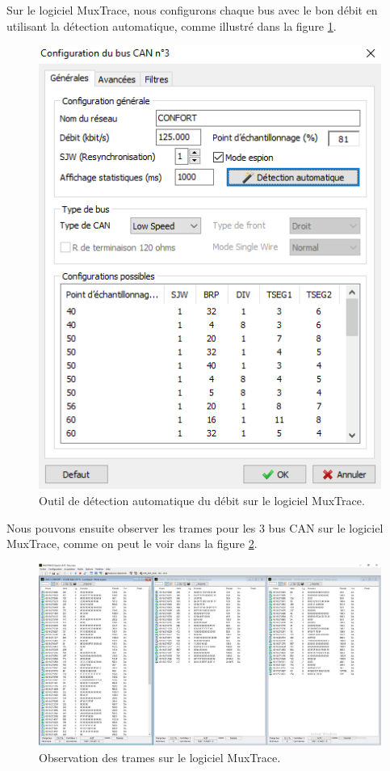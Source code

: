 \documentclass{rapportECC}
\begin{document}
Sur le logiciel MuxTrace, nous configurons chaque bus avec le bon débit en utilisant la détection automatique, comme illustré dans la figure \ref{fig:detection_auto_debit}.

\begin{figure}[H]
    \centering
    \includegraphics[width=.5\textwidth]{./images/detection_auto_debit.PNG}
    \caption{Outil de détection automatique du débit sur le logiciel MuxTrace.}
    \label{fig:detection_auto_debit}
\end{figure}

Nous pouvons ensuite observer les trames pour les 3 bus CAN sur le logiciel MuxTrace, comme on peut le voir dans la figure \ref{fig:liste_trames_bus}.

\begin{figure}[H]
    \centering
    \includegraphics[width=\textwidth]{./images/liste_trames_bus.PNG}
    \caption{Observation des trames sur le logiciel MuxTrace.}
    \label{fig:liste_trames_bus}
\end{figure}
\end{document}
